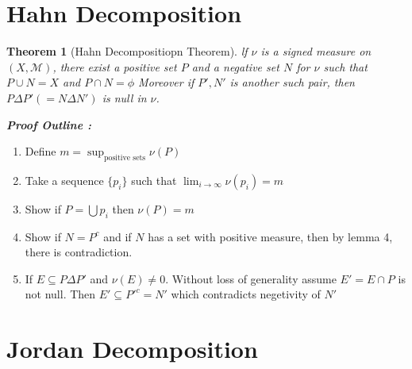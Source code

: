 \documentclass[notoc]{tufte-book}
\newtheorem{theorem}{Theorem}
\begin{document}
\section{Hahn Decomposition}

\begin{theorem}[Hahn Decompositiopn Theorem]
	lf $\nu$ is a signed measure on $(X,\mathcal M)$, there 
	exist a positive set $P$ and a negative set $N$ for $\nu$ such that $P\cup N = X$ and $P\cap N =\phi$ 
	Moreover if  $P', N'$ is another such pair, then $P\Delta P' (= N \Delta N')$ is null in $\nu$.
\end{theorem}
\noindent\textbf{\textit{Proof Outline :}}
\begin{enumerate}
	\item Define $m=\sup_{\text{positive sets}}\nu(P)$
	\item Take a sequence $\{p_i\}$ such that $\lim_{i\to\infty}\nu(p_i)=m$
	\item Show if $P=\bigcup p_i$ then $\nu(P)=m$
	\item Show if $N=P^c$ and if $N$ has a set with positive measure, then by lemma 4, there is contradiction.
	\item If $E\subseteq P\Delta P'$ and $\nu(E)\ne0$. Without loss of generality assume $E'=E\cap P$ is not null. Then $E'\subseteq P'^c=N'$ which contradicts negetivity of $N'$ 
\end{enumerate}
\section{Jordan Decomposition}
\end{document}
